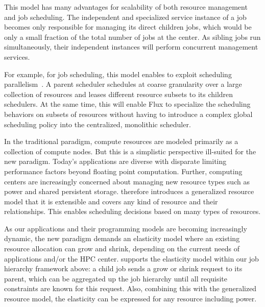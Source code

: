 This model has many advantages for scalability of both
resource management and job scheduling. 
The independent and specialized \flux service instance
of a job becomes only responsible for managing its direct
children jobs, which would be only a small fraction of
the total number of jobs at the center. 
As sibling jobs run simultaneously, their independent
\flux instances will perform concurrent management services.

For example, for job scheduling, this model enables \flux
to exploit scheduling parallelism~\cite{Omega,Mesos}.
A parent scheduler schedules at coarse granularity 
over a large collection of resources and leases different resource subsets 
to its children schedulers. 
At the same time, this will enable Flux to specialize the scheduling behaviors 
on subsets of resources without having to introduce a
complex global scheduling policy into the centralized, monolithic scheduler. 


 In the traditional 
paradigm, compute resources are modeled primarily 
as a collection of compute nodes. But this is a simplistic perspective 
ill-suited for the new paradigm. Today's applications 
are diverse with disparate limiting performance factors 
beyond floating point computation. 
Further, computing centers are increasingly concerned 
about managing new resource types such as power 
and shared persistent storage. \flux therefore introduces a generalized resource
model that it is extensible and covers any kind of resource and their relationships. This enables scheduling
decisions based on many types of resources.


 As our 
applications and their programming models are becoming 
increasingly dynamic, the new paradigm demands 
an elasticity model where an existing resource allocation 
can grow and shrink, depending on the current needs 
of applications and/or the HPC center. 
\flux supports the elasticity model within our job hierarchy 
framework above: a child job sends a grow or shrink request 
to its parent, which can be aggregated up the job hierarchy 
until all requisite constraints are known for this request. 
Also, combining this with the generalized resource model, 
the elasticity can be expressed for any resource including 
power. 

